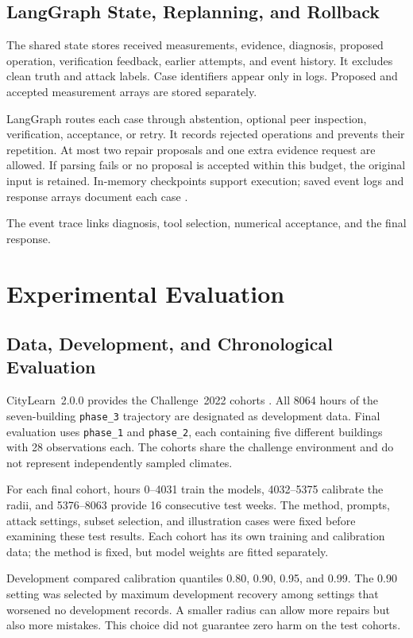 \documentclass[conference]{IEEEtran}
\begin{document}
\subsection{LangGraph State, Replanning, and Rollback}

The shared state stores received measurements, evidence, diagnosis, proposed operation, verification feedback, earlier attempts, and event history. It excludes clean truth and attack labels. Case identifiers appear only in logs. Proposed and accepted measurement arrays are stored separately.

LangGraph routes each case through abstention, optional peer inspection, verification, acceptance, or retry. It records rejected operations and prevents their repetition. At most two repair proposals and one extra evidence request are allowed. If parsing fails or no proposal is accepted within this budget, the original input is retained. In-memory checkpoints support execution; saved event logs and response arrays document each case \cite{langgraph2024}.

The event trace links diagnosis, tool selection, numerical acceptance, and the final response.

\section{Experimental Evaluation}

\subsection{Data, Development, and Chronological Evaluation}

CityLearn~2.0.0 provides the Challenge~2022 cohorts \cite{citylearn2022}. All 8064 hours of the seven-building \texttt{phase\_3} trajectory are designated as development data. Final evaluation uses \texttt{phase\_1} and \texttt{phase\_2}, each containing five different buildings with 28 observations each. The cohorts share the challenge environment and do not represent independently sampled climates.

For each final cohort, hours 0--4031 train the models, 4032--5375 calibrate the radii, and 5376--8063 provide 16 consecutive test weeks. The method, prompts, attack settings, subset selection, and illustration cases were fixed before examining these test results. Each cohort has its own training and calibration data; the method is fixed, but model weights are fitted separately.

Development compared calibration quantiles 0.80, 0.90, 0.95, and 0.99. The 0.90 setting was selected by maximum development recovery among settings that worsened no development records. A smaller radius can allow more repairs but also more mistakes. This choice did not guarantee zero harm on the test cohorts.
\end{document}
